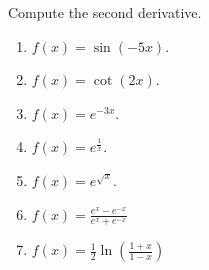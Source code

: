 Compute the second derivative.
\begin{multicols}{3}
\begin{enumerate}
\item $\displaystyle f(x)=\sin (-5x)$. 

\item $\displaystyle f(x)=\cot (2x)$. 

\item $\displaystyle f(x)=e^{-3x}$. 

\item $\displaystyle f(x)=e^{\frac{1}x}$. 

\item $\displaystyle f(x)=e^{\sqrt{x}}$. 

\item $\displaystyle f(x)=\frac{e^{x}-e^{-x}}{e^x+e^{-x}} $

\item $\displaystyle f(x)=\frac{1}2\ln \left(\frac{1+x}{1-x}\right) $

\end{enumerate}
\end{multicols}
